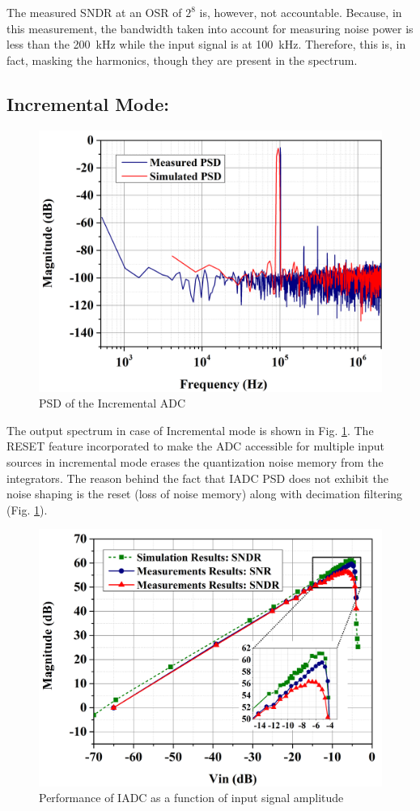 The measured SNDR at an OSR of $2^8$ is, however, not accountable. Because, in this measurement, the bandwidth taken into account for measuring noise power is less than the 200~kHz while the input signal is at 100~kHz. Therefore, this is, in fact, masking the harmonics, though they are present in the spectrum.

\subsection{Incremental Mode:}
%
\begin{figure}[h!]
    \centering
    \includegraphics[width=0.8\columnwidth]{Chap06/Figures/PSD_IADC_sim_meas.jpg}
    \caption{PSD of the Incremental ADC }
    \label{fig:iadc_psd_meas}
\end{figure}
%

The output spectrum in case of Incremental mode is shown in Fig. \ref{fig:iadc_psd_meas}. The RESET feature incorporated to make the ADC accessible for multiple input sources in incremental mode erases the quantization noise memory from the integrators. The reason behind the fact that IADC PSD does not exhibit the noise shaping is the reset (loss of noise memory) along with decimation filtering (Fig. \ref{fig:iadc_psd_meas}).

%
\begin{figure}[h!]
    \centering
    \includegraphics[width=0.8\columnwidth]{Chap06/Figures/snr_vs_vin.jpg}
    \caption{Performance of IADC as a function of input signal amplitude }
    \label{fig:iadc_snr_vs_input}
\end{figure}
%

